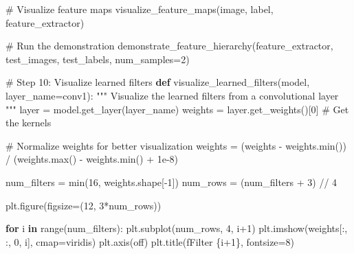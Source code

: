 \documentclass[
  letterpaper,
  DIV=11,
  numbers=noendperiod]{scrreprt}
\newenvironment{Shaded}{\begin{snugshade}}{\end{snugshade}}
\newcommand{\BuiltInTok}[1]{\textcolor[rgb]{0.00,0.23,0.31}{#1}}
\newcommand{\CommentTok}[1]{\textcolor[rgb]{0.37,0.37,0.37}{#1}}
\newcommand{\ControlFlowTok}[1]{\textcolor[rgb]{0.00,0.23,0.31}{\textbf{#1}}}
\newcommand{\DecValTok}[1]{\textcolor[rgb]{0.68,0.00,0.00}{#1}}
\newcommand{\FloatTok}[1]{\textcolor[rgb]{0.68,0.00,0.00}{#1}}
\newcommand{\KeywordTok}[1]{\textcolor[rgb]{0.00,0.23,0.31}{\textbf{#1}}}
\newcommand{\NormalTok}[1]{\textcolor[rgb]{0.00,0.23,0.31}{#1}}
\newcommand{\OperatorTok}[1]{\textcolor[rgb]{0.37,0.37,0.37}{#1}}
\newcommand{\SpecialCharTok}[1]{\textcolor[rgb]{0.37,0.37,0.37}{#1}}
\newcommand{\SpecialStringTok}[1]{\textcolor[rgb]{0.13,0.47,0.30}{#1}}
\newcommand{\StringTok}[1]{\textcolor[rgb]{0.13,0.47,0.30}{#1}}
\begin{document}
\begin{Shaded}
\begin{Highlighting}[]
        \CommentTok{\# Visualize feature maps}
\NormalTok{        visualize\_feature\_maps(image, label, feature\_extractor)}

\CommentTok{\# Run the demonstration}
\NormalTok{demonstrate\_feature\_hierarchy(feature\_extractor, test\_images, test\_labels, num\_samples}\OperatorTok{=}\DecValTok{2}\NormalTok{)}

\CommentTok{\# Step 10: Visualize learned filters}
\KeywordTok{def}\NormalTok{ visualize\_learned\_filters(model, layer\_name}\OperatorTok{=}\StringTok{\textquotesingle{}conv1\textquotesingle{}}\NormalTok{):}
    \CommentTok{"""}
\CommentTok{    Visualize the learned filters from a convolutional layer}
\CommentTok{    """}
\NormalTok{    layer }\OperatorTok{=}\NormalTok{ model.get\_layer(layer\_name)}
\NormalTok{    weights }\OperatorTok{=}\NormalTok{ layer.get\_weights()[}\DecValTok{0}\NormalTok{]  }\CommentTok{\# Get the kernels}
    
    \CommentTok{\# Normalize weights for better visualization}
\NormalTok{    weights }\OperatorTok{=}\NormalTok{ (weights }\OperatorTok{{-}}\NormalTok{ weights.}\BuiltInTok{min}\NormalTok{()) }\OperatorTok{/}\NormalTok{ (weights.}\BuiltInTok{max}\NormalTok{() }\OperatorTok{{-}}\NormalTok{ weights.}\BuiltInTok{min}\NormalTok{() }\OperatorTok{+} \FloatTok{1e{-}8}\NormalTok{)}
    
\NormalTok{    num\_filters }\OperatorTok{=} \BuiltInTok{min}\NormalTok{(}\DecValTok{16}\NormalTok{, weights.shape[}\OperatorTok{{-}}\DecValTok{1}\NormalTok{])}
\NormalTok{    num\_rows }\OperatorTok{=}\NormalTok{ (num\_filters }\OperatorTok{+} \DecValTok{3}\NormalTok{) }\OperatorTok{//} \DecValTok{4}
    
\NormalTok{    plt.figure(figsize}\OperatorTok{=}\NormalTok{(}\DecValTok{12}\NormalTok{, }\DecValTok{3}\OperatorTok{*}\NormalTok{num\_rows))}
    
    \ControlFlowTok{for}\NormalTok{ i }\KeywordTok{in} \BuiltInTok{range}\NormalTok{(num\_filters):}
\NormalTok{        plt.subplot(num\_rows, }\DecValTok{4}\NormalTok{, i}\OperatorTok{+}\DecValTok{1}\NormalTok{)}
\NormalTok{        plt.imshow(weights[:, :, }\DecValTok{0}\NormalTok{, i], cmap}\OperatorTok{=}\StringTok{\textquotesingle{}viridis\textquotesingle{}}\NormalTok{)}
\NormalTok{        plt.axis(}\StringTok{\textquotesingle{}off\textquotesingle{}}\NormalTok{)}
\NormalTok{        plt.title(}\SpecialStringTok{f\textquotesingle{}Filter }\SpecialCharTok{\{}\NormalTok{i}\OperatorTok{+}\DecValTok{1}\SpecialCharTok{\}}\SpecialStringTok{\textquotesingle{}}\NormalTok{, fontsize}\OperatorTok{=}\DecValTok{8}\NormalTok{)}
    

\end{Highlighting}
\end{Shaded}
\end{document}
